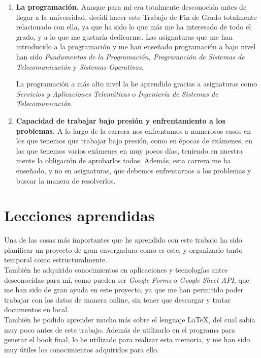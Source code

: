 \documentclass[a4paper, 12pt]{book}
\begin{document}
\begin{enumerate}
  \item \textbf{La programación.} Aunque para mí era totalmente desconocida antes de llegar a la universidad, decidí hacer este Trabajo de Fin de Grado totalmente relacionado con ella, ya que ha sido lo que más me ha interesado de todo el grado, y a lo que me gustaría dedicarme. Las asignaturas que me han introducido a la programación y me han enseñado programación a bajo nivel han sido \textit{Fundamentos de la Programación, Programación de Sistemas de Telecomunicación} y \textit{Sistemas Operativos}.
  
  La programación a más alto nivel la he aprendido gracias a asignaturas como \textit{Servicios y Aplicaciones Telemáticas} o \textit{Ingeniería de Sistemas de Telecomunicación}.
  \item \textbf{Capacidad de trabajar bajo presión y enfrentamiento a los problemas.} A lo largo de la carrera nos enfrentamos a numerosos casos en los que tenemos que trabajar bajo presión, como en épocas de exámenes, en las que tenemos varios exámenes en muy pocos días, teniendo en nuestra mente la obligación de aprobarlos todos. Además, esta carrera me ha enseñado, y no en asignaturas, que debemos enfrentarnos a los problemas y buscar la manera de resolverlos.
\end{enumerate}


\section{Lecciones aprendidas}
\label{sec:lecciones_aprendidas}
Una de las cosas más importantes que he aprendido con este trabajo ha sido planificar un proyecto de gran envergadura como es este, y organizarlo tanto temporal como estructuralmente.\\

También he adquirido conocimientos en aplicaciones y tecnologías antes desconocidas para mí, como pueden ser \textit{Google Forms} o \textit{Google Sheet API}, que me han sido de gran ayuda en este proyecto, ya que me han permitido poder trabajar con los datos de manera online, sin tener que descargar y tratar documentos en local.\\

También he podido aprender mucho más sobre el lenguaje \LaTeX, del cual sabía muy poco antes de este trabajo. Además de utilizarlo en el programa para generar el book final, lo he utilizado para realizar esta memoria, y me han sido muy útiles los conocimientos adquiridos para ello.\\
\end{document}
